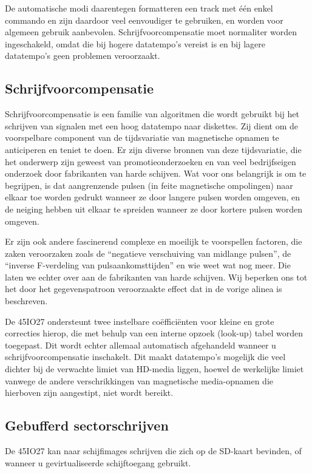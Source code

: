De automatische modi daarentegen formatteren een track met één enkel commando en zijn daardoor veel eenvoudiger te gebruiken, en worden voor algemeen gebruik aanbevolen. Schrijfvoorcompensatie moet normaliter worden ingeschakeld, omdat die bij hogere datatempo's vereist is en bij lagere datatempo's geen problemen veroorzaakt.

\subsection{Schrijfvoorcompensatie}

Schrijfvoorcompensatie is een familie van algoritmen die wordt gebruikt bij het schrijven van signalen met een hoog datatempo naar diskettes. Zij dient om de voorspelbare component van de tijdsvariatie van magnetische opnamen te anticiperen en teniet te doen. Er zijn diverse bronnen van deze tijdsvariatie, die het onderwerp zijn geweest van promotieonderzoeken en van veel bedrijfseigen onderzoek door fabrikanten van harde schijven. Wat voor ons belangrijk is om te begrijpen, is dat aangrenzende pulsen (in feite magnetische ompolingen) naar elkaar toe worden gedrukt wanneer ze door langere pulsen worden omgeven, en de neiging hebben uit elkaar te spreiden wanneer ze door kortere pulsen worden omgeven.

Er zijn ook andere fascinerend complexe en moeilijk te voorspellen factoren, die zaken veroorzaken zoals de ``negatieve verschuiving van midlange pulsen'', de ``inverse F-verdeling van pulsaankomsttijden'' en wie weet wat nog meer. Die laten we echter over aan de fabrikanten van harde schijven. Wij beperken ons tot het door het gegevenspatroon veroorzaakte effect dat in de vorige alinea is beschreven.

De 45IO27 ondersteunt twee instelbare coëfficiënten voor kleine en grote correcties hierop, die met behulp van een interne opzoek (look-up) tabel worden toegepast. Dit wordt echter allemaal automatisch afgehandeld wanneer u schrijfvoorcompensatie inschakelt. Dit maakt datatempo's mogelijk die veel dichter bij de verwachte limiet van HD-media liggen, hoewel de werkelijke limiet vanwege de andere verschrikkingen van magnetische media-opnamen die hierboven zijn aangestipt, niet wordt bereikt.

\subsection{Gebufferd sectorschrijven}

De 45IO27 kan naar schijfimages schrijven die zich op de SD-kaart bevinden, of wanneer u gevirtualiseerde schijftoegang gebruikt.

